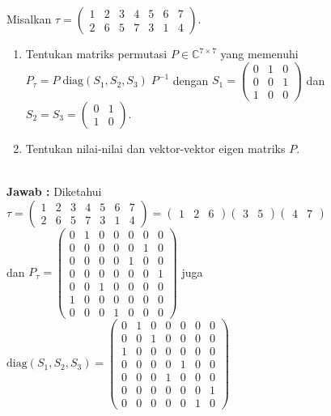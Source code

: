 \documentclass[11pt,a4paper]{article}
\newcommand{\ds}{\displaystyle}
\theoremstyle{plain}
\theoremstyle{definition}
\theoremstyle{remark}
\begin{document}
\begin{enumerate}
\begin{enumerate}
	\- \\
	\textbf{Jawab :} Diketahui $\tau = \begin{pmatrix}
	1 & 2 & 3 & 4 & 5 & 6 & 7 \\
	2 & 6 & 5 & 7 & 3 & 1 & 4 
	\end{pmatrix} = \begin{pmatrix} 1 & 2 & 6 \end{pmatrix} \begin{pmatrix} 3 & 5 \end{pmatrix} \begin{pmatrix} 4 & 7 \end{pmatrix} $\\ dan $\ds P_{\tau} = \begin{pmatrix}
	0 & 1 & 0 & 0 & 0 & 0 & 0\\ 
	0 & 0 & 0 & 0 & 0 & 1 & 0\\ 
	0 & 0 & 0 & 0 & 1 & 0 & 0\\ 
	0 & 0 & 0 & 0 & 0 & 0 & 1\\ 
	0 & 0 & 1 & 0 & 0 & 0 & 0\\ 
	1 & 0 & 0 & 0 & 0 & 0 & 0\\ 
	0 & 0 & 0 & 1 & 0 & 0 & 0
	\end{pmatrix}$ juga $\text{diag}(S_{1}, S_{2}, S_{3})=\begin{pmatrix}
	0 & 1 & 0 & 0 & 0 & 0 & 0\\ 
	0 & 0 & 1 & 0 & 0 & 0 & 0\\ 
	1 & 0 & 0 & 0 & 0 & 0 & 0\\ 
	0 & 0 & 0 & 0 & 1 & 0 & 0\\ 
	0 & 0 & 0 & 1 & 0 & 0 & 0\\ 
	0 & 0 & 0 & 0 & 0 & 0 & 1\\ 
	0 & 0 & 0 & 0 & 0 & 1 & 0
	\end{pmatrix}$
	

\end{enumerate}
\end{enumerate}
\end{document}
